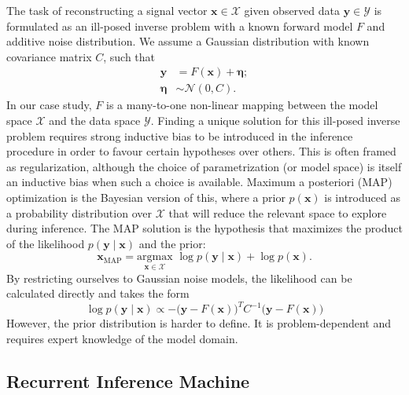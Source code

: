 \documentclass[twocolumn]{aastex631}
\begin{document}
The task of reconstructing a signal vector $\mathbf{x} \in \mathcal{X}$ given 
observed data $\mathbf{y} \in \mathcal{Y}$ is formulated as an ill-posed inverse 
problem with a known forward model $F$ and additive noise distribution. 
We assume a Gaussian distribution with known covariance matrix $C$, 
such that
\begin{equation}\label{eq:MainEquation} 
\begin{aligned}
        \mathbf{y} &= F(\mathbf{x}) + \boldsymbol{\eta};\\[2pt]
        \boldsymbol{\eta} &\sim \mathcal{N}(0, C).
\end{aligned}
\end{equation} 
In our case study, $F$ is a many-to-one non-linear 
mapping between the model space $\mathcal{X}$ 
and the data space $\mathcal{Y}$. 
Finding a unique solution for this ill-posed inverse problem 
requires strong inductive bias to be introduced in the inference procedure 
in order to favour certain hypotheses over others. This is often framed 
as regularization, although the choice of parametrization (or model space) is itself 
an inductive bias when such a choice is available. Maximum a posteriori (MAP)
optimization is the Bayesian version of this, where a prior 
$p(\mathbf{x})$ is introduced as a
probability distribution over $\mathcal{X}$ that will reduce the 
relevant space to explore during inference. The MAP solution 
is the hypothesis that maximizes the product of the likelihood $p(\mathbf{y} \mid \mathbf{x})$ 
and the prior:
\begin{equation}\label{eq:Posterior} 
        \mathbf{x}_{\mathrm{MAP}} = \underset{\mathbf{x} \in \mathcal{X}}{ \mathrm{argmax}}\,\,
        \log p(\mathbf{y} \mid \mathbf{x}) + \log p(\mathbf{x}).
\end{equation} 
By restricting ourselves to Gaussian noise models, the likelihood 
can be calculated directly and takes the form
\begin{equation}\label{eq:Likelihood} 
        \log p(\mathbf{y} \mid \mathbf{x}) \propto -
        \big(\mathbf{y} - F(\mathbf{x})\big)^{T} C^{-1} \big(\mathbf{y} - F(\mathbf{x})\big)
\end{equation} 
However, the prior distribution is harder to define. 
It is problem-dependent and requires 
expert knowledge of the model domain. 


\subsection{Recurrent Inference Machine}\label{sec:rim}
\end{document}
